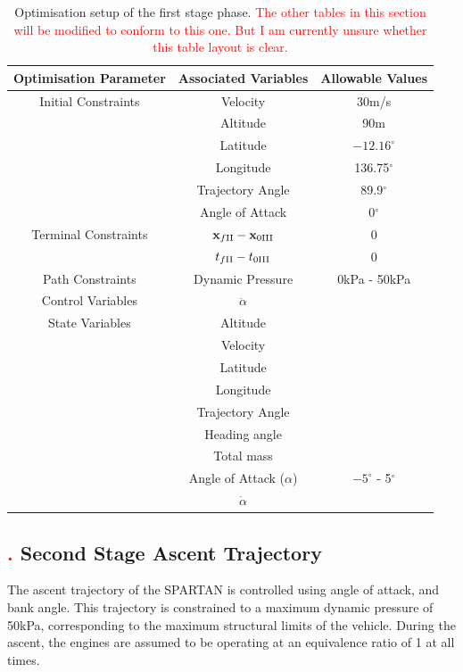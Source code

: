 \begin{table}[H]
\centering
\begin{tabular}{|c|c|c|}
	\hline Optimisation Parameter  & Associated Variables & Allowable Values\\
	\hline Initial Constraints  & Velocity & 30m/s\\ & Altitude& 90m \\ & Latitude & $-12.16^\circ$ \\& Longitude & 136.75$^\circ$\\ & Trajectory Angle & 89.9$^\circ$\\ & Angle of Attack& 0$^\circ$\\
	\hline Terminal Constraints & $\textbf{x}_{f\textrm{\rom{2}}} - \textbf{x}_{0\textrm{\rom{3}}}$ & 0\\ & $t_{f\textrm{\rom{2}}} - t_{0\textrm{\rom{3}}}$ & 0\\
	\hline Path Constraints & Dynamic Pressure & 0kPa - 50kPa\\ 
		\hline Control Variables & $\ddot{\alpha}$ &\\ 
		\hline State Variables & Altitude & \\ & Velocity& \\  & Latitude& \\  & Longitude& \\  & Trajectory Angle& \\  & Heading angle& \\  & Total mass& \\  & Angle of Attack ($\alpha$)&  $-5^\circ$ - 5$^\circ$\\  & $\dot{\alpha}$& \\ 
	\hline 
\end{tabular} 

\caption{Optimisation setup of the first stage phase. \textcolor{red}{The other tables in this section will be modified to conform to this one. But I am currently unsure whether this table layout is clear.}}

\end{table}



\subsection{\textcolor{red}{.} Second Stage Ascent Trajectory}

The ascent trajectory of the SPARTAN is controlled using angle of attack, and bank angle. This trajectory is constrained to a maximum dynamic pressure of 50kPa, corresponding to the maximum structural limits of the vehicle. During the ascent, the engines are assumed to be operating at an equivalence ratio of 1 at all times. 


